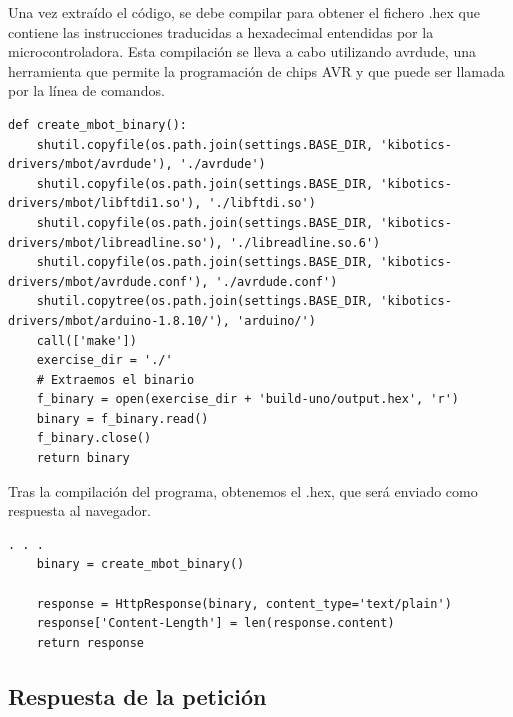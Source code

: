 \documentclass{report}
\begin{document}
Una vez extraído el código, se debe compilar para obtener el fichero .hex que contiene las instrucciones traducidas a hexadecimal entendidas por la microcontroladora. Esta compilación se lleva a cabo utilizando avrdude, una herramienta que permite la programación de chips AVR y que puede ser llamada por la línea de comandos.
\\
\begin{lstlisting}[frame=single,breaklines=true, label=Compilado y obtención del .hex, caption=Compilado y obtención del .hex, captionpos=b]
def create_mbot_binary():
    shutil.copyfile(os.path.join(settings.BASE_DIR, 'kibotics-drivers/mbot/avrdude'), './avrdude')
    shutil.copyfile(os.path.join(settings.BASE_DIR, 'kibotics-drivers/mbot/libftdi1.so'), './libftdi.so')
    shutil.copyfile(os.path.join(settings.BASE_DIR, 'kibotics-drivers/mbot/libreadline.so'), './libreadline.so.6')
    shutil.copyfile(os.path.join(settings.BASE_DIR, 'kibotics-drivers/mbot/avrdude.conf'), './avrdude.conf')
    shutil.copytree(os.path.join(settings.BASE_DIR, 'kibotics-drivers/mbot/arduino-1.8.10/'), 'arduino/')
    call(['make'])
    exercise_dir = './'
    # Extraemos el binario
    f_binary = open(exercise_dir + 'build-uno/output.hex', 'r')
    binary = f_binary.read()
    f_binary.close()
    return binary
\end{lstlisting}
Tras la compilación del programa, obtenemos el .hex, que será enviado como respuesta al navegador.
\\
\begin{lstlisting}[frame=single,breaklines=true, label=Respuesta a la petición que envió el navegador, caption=Respuesta a la petición que envió el navegador, captionpos=b]
    . . .
    binary = create_mbot_binary()

    response = HttpResponse(binary, content_type='text/plain')
    response['Content-Length'] = len(response.content)
    return response
\end{lstlisting}

\subsection{Respuesta de la petición}
\end{document}
